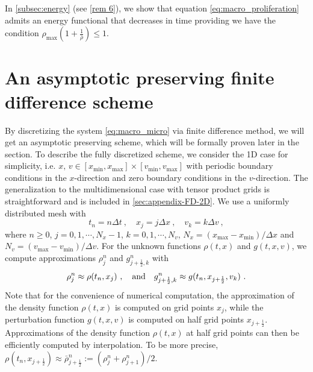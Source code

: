 \documentclass[review,onefignum,onetabnum]{siamart220329}
\newcommand {\dx}   {\Delta x}
\begin{document}
{In \cref{subsec:energy} (see \cref{rem 6}), we show that equation \cref{eq:macro_proliferation} admits an energy functional that decreases in time providing we have the condition $\rho_{\max} (1 + \frac{1}{\bar{\rho}}) \leq 1$}. 

\section{An asymptotic preserving finite difference scheme}\label{sec: implicit-explicit scheme}
By discretizing the system  \cref{eq:macro_micro} via finite difference method, we will get an asymptotic preserving scheme, which will be formally proven later in the section. 
To describe the fully discretized scheme, we consider the 1D case for simplicity, i.e. {$x, \,v \in [x_{\min}, x_{\max}]\times [v_{\min}, v_{\max}]$ with periodic boundary conditions in the $x$-direction and zero boundary conditions in the $v$-direction.} The generalization to
the multidimensional case with tensor product grids is straightforward and is included in  \cref{sec:appendix-FD-2D}. We use a uniformly distributed mesh with 
\begin{equation*}
    t_n = n \Delta t\ , \quad x_j = j \dx\ , \quad v_k = k \Delta v\  ,
\end{equation*}
where $n\ge0$, $j=0,1,\cdots, N_x-1$, $k=0,1,\cdots, N_v$, $N_x = (x_{\max} - x_{\min}) / \Delta x$ and $N_v = (v_{\max} - v_{\min}) / \Delta v$. 
For the unknown functions $\rho(t,x)$ and $g(t,x,v)$, we compute {\color{red}{their}} approximations $\rho_j^n$ and $g^n_{j+\frac{1}{2},k}$ with 
\begin{equation*}
  \rho_j^n\approx\rho(t_n,x_j)\ ,\quad\textnormal{and} \quad  
  g^n_{j+\frac{1}{2},k}\approx g(t_n,x_{j+\frac{1}{2}},v_k)\ . 
\end{equation*}
Note that for the convenience of numerical computation, the approximation of the density function $\rho(t,x)$ is computed on grid points $x_j$, while the perturbation function $g(t,x,v)$ is computed on half grid points $x_{j+\frac12}$. 
Approximations of the density function $\rho(t,x)$ at half grid points can then be  efficiently computed by interpolation. 
To be more precise,  $\rho(t_n,x_{j+\frac12}) \approx \bar{\rho}_{j+\frac12}^n:=(\rho_j^n + \rho_{j+1}^n)/2$. 
\end{document}
